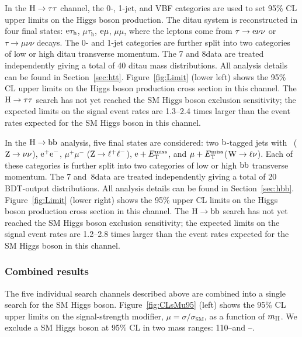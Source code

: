 \documentclass[12pt,twoside,a4paper,cmspaper,final,collab]{cms-tdr}
\begin{document}
In the $\mathrm{H} \to \tau\tau$ channel, the 0-, 1-jet, and VBF
categories are used to set 95\% CL upper limits
on the Higgs boson production. The ditau system is reconstructed in four final states:
$\mathrm{e}\tau_{\mathrm{h}}$, $\mu\tau_{\mathrm{h}}$, $\mathrm{e}\mu$, $\mu\mu$, where the leptons come
from $\tau \to \mathrm{e}\nu\nu$ or $\tau \to \mu\nu\nu$
decays.
The 0- and 1-jet categories are further split into two categories of low or
high ditau transverse momentum.
The 7 and 8\TeV data are treated independently giving a total of
40 ditau mass distributions.
All analysis details can be found in Section~\ref{sec:htt}.
Figure~\ref{fig:Limit} (lower left) shows the 95\% CL upper limits
on the Higgs boson production cross section in this channel.
The $\mathrm{H} \to \tau\tau$ search
has not yet reached the SM Higgs boson exclusion sensitivity;
the expected limits on the signal event rates are
1.3--2.4 times larger than the event rates expected for the SM Higgs boson in this channel.



In the $\mathrm{H} \to \mathrm{b}\mathrm{b}$ analysis, five final states are considered:
two $\mathrm{b}$-tagged jets with \met\ ($\mathrm{Z} \to \nu\nu$), $\mathrm{e}^+\mathrm{e}^-$,
$\mu^+\mu^-$ ($\mathrm{Z} \to \ell^+\ell^-$), $\mathrm{e} + E_{\mathrm{T}}^{\text{miss}}$, and $\mu + E_{\mathrm{T}}^{\text{miss}}$($\mathrm{W} \to \ell\nu$).
Each of these categories is further split into two categories of low or high $\mathrm{b}\mathrm{b}$ transverse momentum.
The 7 and~8\TeV data are treated independently giving a total of
20 BDT-output distributions. All analysis details can be found in Section~\ref{sec:hbb}.
Figure~\ref{fig:Limit} (lower right) shows the 95\% upper CL limits
on the Higgs boson production cross section in this channel.
The $\mathrm{H} \to \mathrm{b}\mathrm{b}$ search
has not yet reached the SM Higgs boson exclusion sensitivity;
the expected limits on the signal event rates are
1.2--2.8 times larger than the event rates expected for the SM Higgs boson in this channel.



\subsubsection{Combined results}


The five individual search channels described above are combined
into a single search for the SM Higgs boson.
Figure~\ref{fig:CLsMu95} (left) shows the 95\% CL upper limits on the signal-strength modifier,
$\mu = \sigma / \sigma_{\mathrm{SM}}$,
as a function of $m_{\mathrm{H}}$.
We exclude a SM Higgs boson at 95\% CL in two mass ranges:
110--\ObsNFL\GeV and \ObsNFH--\MHmax\GeV.
\end{document}

